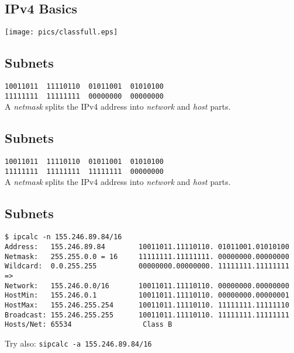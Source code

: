 \documentclass[xga]{xdvislides}
\begin{document}
\subsection{IPv4 Basics}
\vspace*{\fill}
\begin{center}
	\texttt{[image: pics/classfull.eps]}
\end{center}
\vspace*{\fill}

\subsection{Subnets}
\vspace{.5in}
\Hugesize
\begin{center}
\verb|10011011  11110110  01011001  01010100| \\

\verb|11111111  11111111  00000000  00000000| \\
\vspace{.5in}
A {\em netmask} splits the IPv4 address into {\em network} and {\em host}
parts.
\end{center}
\Normalsize

\subsection{Subnets}
\vspace{.5in}
\Hugesize
\begin{center}
\verb|10011011  11110110  01011001  01010100| \\

\verb|11111111  11111111  11111111  00000000| \\
\vspace{.5in}
A {\em netmask} splits the IPv4 address into {\em network} and {\em host}
parts.
\end{center}
\Normalsize

\subsection{Subnets}
\begin{verbatim}
$ ipcalc -n 155.246.89.84/16
Address:   155.246.89.84        10011011.11110110. 01011001.01010100
Netmask:   255.255.0.0 = 16     11111111.11111111. 00000000.00000000
Wildcard:  0.0.255.255          00000000.00000000. 11111111.11111111
=>
Network:   155.246.0.0/16       10011011.11110110. 00000000.00000000
HostMin:   155.246.0.1          10011011.11110110. 00000000.00000001
HostMax:   155.246.255.254      10011011.11110110. 11111111.11111110
Broadcast: 155.246.255.255      10011011.11110110. 11111111.11111111
Hosts/Net: 65534                 Class B

\end{verbatim}
\vspace{.5in}
Try also: \verb+sipcalc -a 155.246.89.84/16+
\end{document}
